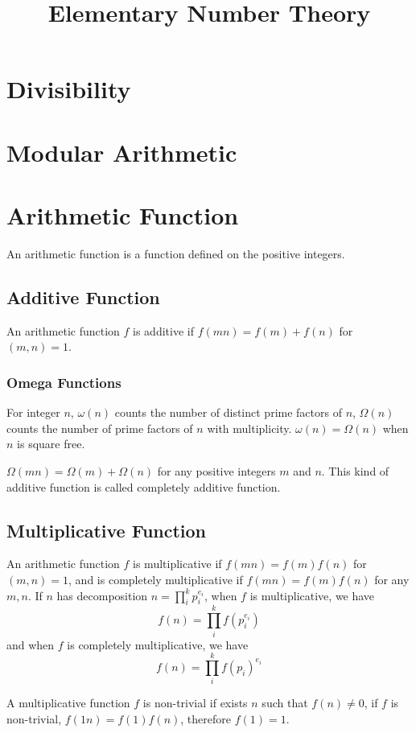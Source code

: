 \documentclass{article}
\title{Elementary Number Theory}
\begin{document}
\maketitle
\newpage
\tableofcontents
\newpage

\section{Divisibility}

\section{Modular Arithmetic}

\section{Arithmetic Function}
An arithmetic function is a function defined on the positive integers.

\subsection{Additive Function}
An arithmetic function $f$ is additive if $f(mn) = f(m) + f(n)$ for $(m, n) = 1$.

\subsubsection*{Omega Functions}
For integer $n$, $\omega(n)$ counts the number of distinct prime factors of $n$,
$\Omega(n)$ counts the number of prime factors of $n$ with multiplicity.
$\omega(n) = \Omega(n)$ when $n$ is square free.

$\Omega(mn) = \Omega(m) + \Omega(n)$ for any positive integers $m$ and $n$.
This kind of additive function is called completely additive function.

\subsection{Multiplicative Function}
An arithmetic function $f$ is multiplicative if $f(mn) = f(m)f(n)$ for $(m, n) = 1$,
and is completely multiplicative if $f(mn) = f(m)f(n)$ for any $m, n$.
If $n$ has decomposition $n = \prod_i^k p_i^{e_i}$, when $f$ is multiplicative, we have
$$f(n) = \prod_i^k f(p_i^{e_i})$$
and when $f$ is completely multiplicative, we have
$$f(n) = \prod_i^k f(p_i)^{e_i}$$

A multiplicative function $f$ is non-trivial if exists $n$ such that $f(n) \neq 0$,
if $f$ is non-trivial, $f(1 n) = f(1)f(n)$, therefore $f(1) = 1$.
\end{document}
